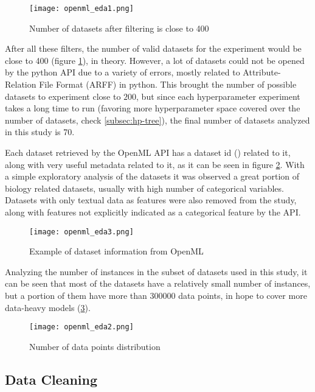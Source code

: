 \begin{figure}[!h]
    \centering
    \texttt{[image: openml\_eda1.png]} 
    \caption{Number of datasets after filtering is close to 400}
    \label{fig:openml-eda1}
\end{figure}

After all these filters, the number of valid datasets for the experiment would be close to 400 (figure \ref{fig:openml-eda1}), in theory. However, a lot of datasets could not be opened by the python API due to a variety of errors, mostly related to Attribute-Relation File Format (ARFF) in python. This brought the number of possible datasets to experiment close to $200$, but since each hyperparameter experiment takes a long time to run (favoring more hyperparameter space covered over the number of datasets, check \ref{subsec:hp-tree}), the final number of datasets analyzed in this study is 70.


Each dataset retrieved by the OpenML API has a dataset id () related to it, along with very useful metadata related to it, as it can be seen in figure \ref{fig:openml-eda3}. With a simple exploratory analysis of the datasets it was observed a great portion of biology related datasets, usually with high number of categorical variables. Datasets with only textual data as features were also removed from the study, along with features not explicitly indicated as a categorical feature by the API.

\begin{figure}[!h]
    \centering
    \texttt{[image: openml\_eda3.png]} 
    \caption{Example of dataset information from OpenML}
    \label{fig:openml-eda3}
\end{figure}

Analyzing the number of instances in the subset of datasets used in this study, it can be seen that most of the datasets have a relatively small number of instances, but a portion of them have more than $300000$ data points, in hope to cover more data-heavy models (\ref{fig:openml-eda2}).

\begin{figure}[!h]
    \centering
    \texttt{[image: openml\_eda2.png]} 
    \caption{Number of data points distribution}
    \label{fig:openml-eda2}
\end{figure}

\newpage

\subsection{Data Cleaning}

